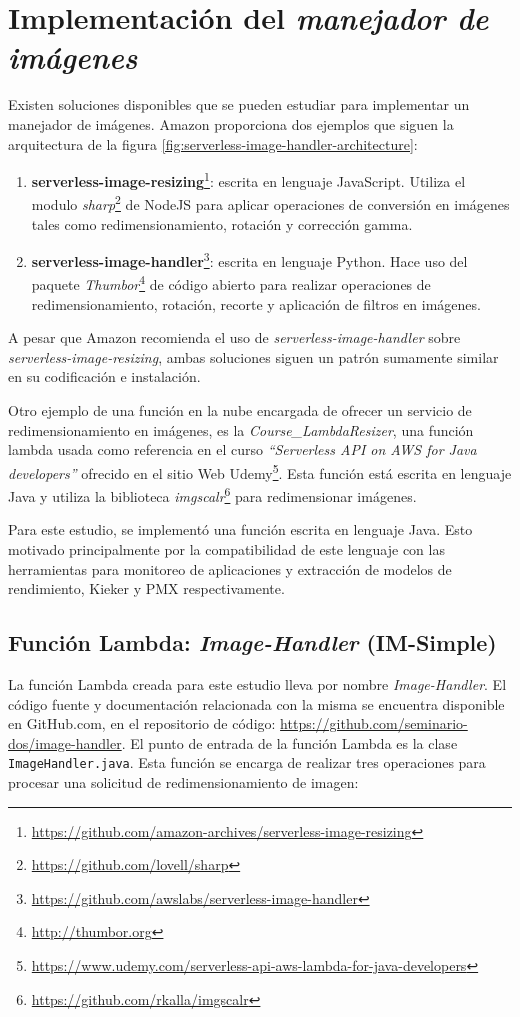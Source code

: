 \section{Implementación del \emph{manejador de imágenes}}
Existen soluciones disponibles que se pueden estudiar para implementar un manejador de imágenes. Amazon proporciona dos ejemplos que siguen la arquitectura de la figura \ref{fig:serverless-image-handler-architecture}:
\begin{enumerate}
    \item \textbf{{serverless-image-resizing}}\footnote{\url{https://github.com/amazon-archives/serverless-image-resizing}}: escrita en lenguaje JavaScript. Utiliza el modulo \emph{sharp}\footnote{\url{https://github.com/lovell/sharp}} de NodeJS para aplicar operaciones de conversión en imágenes tales como redimensionamiento, rotación y corrección gamma.
    \item \textbf{{serverless-image-handler}}\footnote{\url{https://github.com/awslabs/serverless-image-handler}}: escrita en lenguaje Python. Hace uso del paquete \emph{Thumbor}\footnote{\url{http://thumbor.org}} de código abierto para realizar operaciones de redimensionamiento, rotación, recorte y aplicación de filtros en imágenes.
\end{enumerate}

A pesar que Amazon recomienda el uso de \emph{serverless-image-handler} sobre \emph{serverless-image-resizing}, ambas soluciones siguen un patrón sumamente similar en su codificación e instalación. 

Otro ejemplo de una función en la nube encargada de ofrecer un servicio de redimensionamiento en imágenes, es la \emph{Course\_LambdaResizer}, una función lambda usada como referencia en el curso \emph{``Serverless API on AWS for Java developers''} ofrecido en el sitio Web Udemy\footnote{\url{https://www.udemy.com/serverless-api-aws-lambda-for-java-developers}}. Esta función está escrita en lenguaje Java y utiliza la biblioteca \emph{imgscalr}\footnote{\url{https://github.com/rkalla/imgscalr}} para redimensionar imágenes.

Para este estudio, se implementó una función escrita en lenguaje Java. Esto motivado principalmente por la compatibilidad de este lenguaje con las herramientas para monitoreo de aplicaciones y extracción de modelos de rendimiento, Kieker y PMX respectivamente.

\subsection{Función Lambda: \emph{Image-Handler} (IM-Simple)}\label{sec:image-handler}
La función Lambda creada para este estudio lleva por nombre \emph{Image-Handler}. El código fuente y documentación relacionada con la misma se encuentra disponible en GitHub.com, en el repositorio de código: \url{https://github.com/seminario-dos/image-handler}. El punto de entrada de la función Lambda es la clase \texttt{ImageHandler.java}. Esta función se encarga de realizar tres operaciones para procesar una solicitud de redimensionamiento de imagen:

